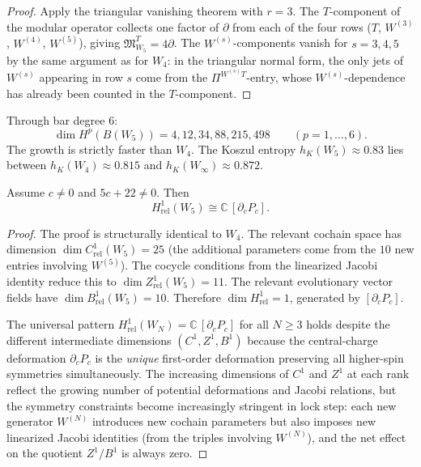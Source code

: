 \begin{proof}
Apply the triangular vanishing theorem with $r=3$. The
$T$-component of the modular operator collects one factor of $\partial$
from each of the four rows ($T$, $W^{(3)}$, $W^{(4)}$, $W^{(5)}$),
giving $\mathfrak{M}_{W_5}^T = 4\partial$. The $W^{(s)}$-components
vanish for $s=3,4,5$ by the same argument as for $W_4$: in the
triangular normal form, the only jets of $W^{(s)}$ appearing in
row $s$ come from the $\Pi^{W^{(s)}T}$-entry, whose $W^{(s)}$-dependence
has already been counted in the $T$-component.
\end{proof}

\begin{computation}
Through bar degree $6$:
\[
\dim H^p(B(W_5)) = 4, 12, 34, 88, 215, 498
\qquad (p = 1,\dots,6).
\]
The growth is strictly faster than $W_4$. The Koszul entropy
$h_K(W_5) \approx 0.83$ lies between
$h_K(W_4) \approx 0.815$ and $h_K(W_\infty) \approx 0.872$.
\end{computation}

\begin{theorem}
Assume $c \neq 0$ and $5c+22 \neq 0$. Then
\[
H^1_{\mathrm{rel}}(W_5) \cong \mathbb{C}\,[\partial_c P_c].
\]
\end{theorem}

\begin{proof}
The proof is structurally identical to $W_4$. The relevant cochain
space has dimension $\dim C^1_{\mathrm{rel}}(W_5) = 25$
(the additional parameters come from the $10$ new entries involving
$W^{(5)}$). The cocycle conditions from the linearized Jacobi identity
reduce this to $\dim Z^1_{\mathrm{rel}}(W_5) = 11$. The relevant
evolutionary vector fields have $\dim B^1_{\mathrm{rel}}(W_5) = 10$.
Therefore $\dim H^1_{\mathrm{rel}} = 1$, generated by $[\partial_c P_c]$.

The universal pattern $H^1_{\mathrm{rel}}(W_N) = \mathbb{C}\,[\partial_c P_c]$
for all $N \geq 3$ holds despite the different intermediate dimensions
$(C^1, Z^1, B^1)$ because the central-charge deformation
$\partial_c P_c$ is the \emph{unique} first-order deformation
preserving all higher-spin symmetries simultaneously. The increasing
dimensions of $C^1$ and $Z^1$ at each rank reflect the growing
number of potential deformations and Jacobi relations, but the
symmetry constraints become increasingly stringent in lock step:
each new generator $W^{(N)}$ introduces new cochain parameters
but also imposes new linearized Jacobi identities (from the triples
involving $W^{(N)}$), and the net effect on the quotient $Z^1/B^1$
is always zero.
\end{proof}

